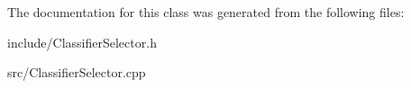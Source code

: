 The documentation for this class was generated from the following files\+:\begin{DoxyCompactItemize}
\item 
include/Classifier\+Selector.\+h\item 
src/Classifier\+Selector.\+cpp\end{DoxyCompactItemize}
